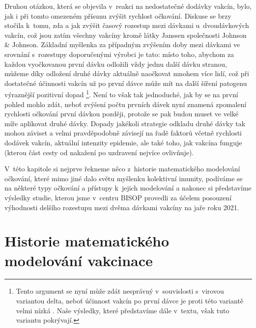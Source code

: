 Druhou otázkou, která se objevila v~reakci na nedostatečné dodávky vakcín, bylo, jak i při tomto omezeném přísunu zvýšit rychlost očkování. Diskuse se brzy stočila k~tomu, zda a jak zvýšit časový rozestup mezi dávkami u~dvoudávkových vakcín, což jsou zatím všechny vakcíny kromě látky Janssen společnosti Johnson \& Johnson. Základní myšlenka za případným zvýšením doby mezi dávkami ve srovnání s~rozestupy doporučenými výrobci je tato: místo toho, abychom za každou vyočkovanou první dávku odložili vždy jednu další dávku stranou, můžeme díky odložení druhé dávky aktuálně naočkovat mnohem více lidí, což při dostatečné účinnosti vakcín už po první dávce může mít na další šíření patogenu výraznější pozitivní dopad \cite{Paltiel_etal2021,Tuite_etal2021}\footnote{Tento argument se nyní může zdát nesprávný v~souvislosti s~virovou variantou delta, neboť účinnost vakcín po první dávce je proti této variantě velmi nízká \cite{delta}. Naše výsledky, které představíme dále v~textu, však tuto variantu pokrývají.}. Není to však tak jednoduché, jak by se na první pohled mohlo zdát, neboť zvýšení počtu prvních dávek nyní znamená zpomalení rychlosti očkování první dávkou později, protože se pak budou muset ve velké míře aplikovat druhé dávky. Dopady jakékoli strategie odkladu druhé dávky tak mohou záviset a velmi pravděpodobně závisejí na řadě faktorů včetně rychlosti dodávek vakcín, aktuální intenzity epidemie, ale také toho, jak vakcína funguje (kterou část cesty od nakažení po uzdravení nejvíce ovlivňuje). 

V~této kapitole si nejprve řekneme něco z~historie matematického modelování očkování, které mimo jiné dalo světu myšlenku kolektivní imunity, podíváme se na některé typy očkování a přístupy k~jejich modelování a nakonec si představíme výsledky studie, kterou jsme v~centru BISOP provedli za účelem posouzení výhodnosti delšího rozestupu mezi dvěma dávkami vakcíny na jaře roku 2021.

\section*{Historie matematického modelování vakcinace}

